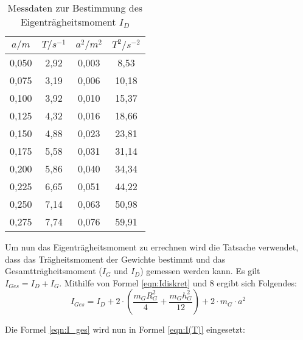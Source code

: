 \begin{table}
  \centering
  \caption{Messdaten zur Bestimmung des Eigenträgheitsmoment $I_D$}
  \label{tab:eigentrmom}
  \begin{tabular}{c c c c}
    \toprule
    $a/m$ & $T/s^{-1}$ & $a^2/m^2$ & $T^2/s^{-2}$ \\
    \midrule
    0,050 & 2,92 & 0,003 & 8,53 \\
    0,075 & 3,19 & 0,006 & 10,18 \\
    0,100 & 3,92 & 0,010 & 15,37 \\
    0,125 & 4,32 & 0,016 & 18,66 \\
    0,150 & 4,88 & 0,023 & 23,81 \\
    0,175 & 5,58 & 0,031 & 31,14 \\
    0,200 & 5,86 & 0,040 & 34,34 \\
    0,225 & 6,65 & 0,051 & 44,22 \\
    0,250 & 7,14 & 0,063 & 50,98 \\
    0,275 & 7,74 & 0,076 & 59,91 \\
    \bottomrule
  \end{tabular}
\end{table}

Um nun das Eigenträgheitsmoment zu errechnen wird die Tatsache verwendet, dass das Trägheitsmoment der Gewichte bestimmt und
das Gesamtträgheitsmoment ($I_G$ und $I_D$) gemessen werden kann. Es gilt $I_{Ges} = I_D + I_G$. Mithilfe von Formel \ref{eqn:Idiskret} und 8 ergibt sich Folgendes:
\begin{equation}
  \label{eqn:I_ges}
    I_{Ges} = I_D + 2 \cdot \left(\frac{m_G R_G^2}{4} + \frac{m_G h_G^2}{12} \right) + 2 \cdot m_G \cdot a^2
\end{equation}

Die Formel \ref{eqn:I_ges} wird nun in Formel \ref{eqn:I(T)} eingesetzt:

